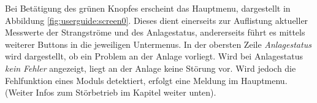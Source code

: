 Bei Bet\"atigung des gr\"unen Knopfes  erscheint das Hauptmenu, dargestellt in
Abbildung \ref{fig:userguide:screen0}. Dieses dient  einerseits zur Auflistung
aktueller  Messwerte der  Strangstr\"ome  und  des Anlagestatus,  andererseits
f\"uhrt  es mittels  weiterer  Buttons in  die  jeweiligen Untermenus. In  der
obersten Zeile  \emph{Anlagestatus} wird  dargestellt, ob  ein Problem  an der
Anlage vorliegt. Wird bei Anlagestatus  \emph{kein Fehler} angezeigt, liegt an
der  Anlage keine  St\"orung vor. Wird  jedoch die  Fehlfunktion eines  Moduls
detektiert, erfolgt eine Meldung im Hauptmenu. (Weiter Infos zum St\"orbetrieb
im Kapitel weiter unten).

\noindent{}
\noindent{}

